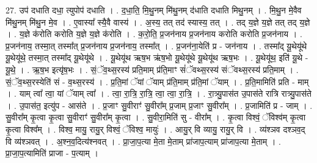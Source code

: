 \documentclass[17pt]{extarticle}
\begin{document}
27. उप॑ दधाति दधा॒ त्युपोप॑ दधाति । . द॒धा॒ति॒ मि॒थु॒नम् मि॑थु॒नम् द॑धाति दधाति मिथु॒नम् । . मि॒थु॒न मे॒वैव मि॑थु॒नम् मि॑थु॒न मे॒व । . ए॒वास्या᳚ स्यै॒वै वास्य॑ । . अ॒स्य॒ तत् तद॑ स्यास्य॒ तत् । . तद् य॒ज्ञे य॒ज्ञे तत् तद् य॒ज्ञे । . य॒ज्ञे क॑रोति करोति य॒ज्ञे य॒ज्ञे क॑रोति । . क॒रो॒ति॒ प्र॒जन॑नाय प्र॒जन॑नाय करोति करोति प्र॒जन॑नाय । . प्र॒जन॑नाय॒ तस्मा॒त् तस्मा᳚त् प्र॒जन॑नाय प्र॒जन॑नाय॒ तस्मा᳚त् । . प्र॒जन॑ना॒येति॑ प्र - जन॑नाय । . तस्मा᳚द् यू॒थेयू॑थे यू॒थेयू॑थे॒ तस्मा॒त् तस्मा᳚द् यू॒थेयू॑थे । . यू॒थेयू॑थ ऋष॒भ ऋ॑ष॒भो यू॒थेयू॑थे यू॒थेयू॑थ ऋष॒भः । . यू॒थेयू॑थ॒ इति॑ यू॒थे - यू॒थे॒ । . ऋ॒ष॒भ इत्यृ॑ष॒भः । . सं॒ॅव॒थ्स॒रस्य॑ प्रति॒माम् प्र॑ति॒माꣳ सं॑ॅवथ्स॒रस्य॑ संॅवथ्स॒रस्य॑ प्रति॒माम् । . सं॒ॅव॒थ्स॒रस्येति॑ सं - व॒थ्स॒रस्य॑ । . प्र॒ति॒मां ॅयां ॅयाम् प्र॑ति॒माम् प्र॑ति॒मां ॅयाम् । . प्र॒ति॒मामिति॑ प्रति - माम् । . याम् त्वा᳚ त्वा॒ यां ॅयाम् त्वा᳚ । . त्वा॒ रा॒त्रि॒ रा॒त्रि॒ त्वा॒ त्वा॒ रा॒त्रि॒ । . रा॒त्र्यु॒पास॑त उ॒पास॑ते रात्रि रात्र्यु॒पास॑ते । . उ॒पास॑त॒ इत्यु॑प - आस॑ते । . प्र॒जाꣳ सु॒वीराꣳ॑ सु॒वीरा᳚म् प्र॒जाम् प्र॒जाꣳ सु॒वीरा᳚म् । . प्र॒जामिति॑ प्र - जाम् । . सु॒वीरा᳚म् कृ॒त्वा कृ॒त्वा सु॒वीराꣳ॑ सु॒वीरा᳚म् कृ॒त्वा । . सु॒वीरा॒मिति॑ सु - वीरा᳚म् । . कृ॒त्वा विश्वं॒ ॅविश्व॑म् कृ॒त्वा कृ॒त्वा विश्व᳚म् । . विश्व॒ मायु॒ रायु॒र् विश्वं॒ ॅविश्व॒ मायुः॑ । . आयु॒र् वि व्यायु॒ रायु॒र् वि । . व्य॑श्ञव दश्ञव॒द् वि व्य॑श्ञवत् । . अ॒श्न॒व॒दित्य॑श्नवत् । . प्रा॒जा॒प॒त्या मे॒ता मे॒ताम् प्रा॑जाप॒त्याम् प्रा॑जाप॒त्या मे॒ताम् । . प्रा॒जा॒प॒त्यामिति॑ प्राजा - प॒त्याम् । \newline
\end{document}
